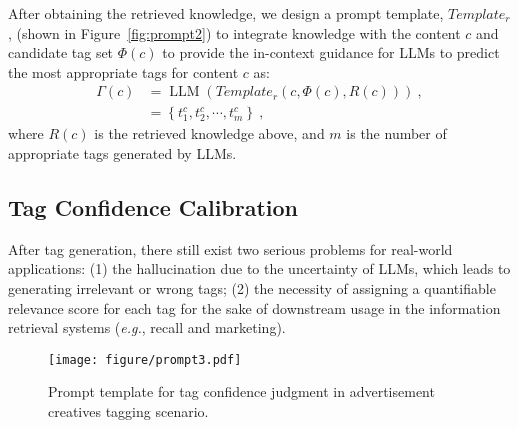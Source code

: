 After obtaining the retrieved knowledge, we design a prompt template, ${Template_r}$,  (shown in Figure~\ref{fig:prompt2}) to integrate knowledge with the content $c$ and candidate tag set $\Phi(c)$ to provide the in-context guidance for LLMs to predict the most appropriate tags for content $c$ as:
\begin{equation}
\begin{aligned}
      \Gamma(c)  &=\operatorname{LLM}({Template_r}(c, \Phi(c), R(c)))~, \\
      &= \left\{t^c_1, t^c_2, \cdots, t^c_m\right\}~,
\end{aligned}
\end{equation}
where $R(c)$ is the retrieved knowledge above, and $m$ is the number of appropriate tags generated by LLMs.





\subsection{Tag Confidence Calibration}
After tag generation, there still exist two serious problems for real-world applications: (1) the hallucination due to the uncertainty of LLMs, which leads to generating irrelevant or wrong tags; (2) the necessity of assigning a quantifiable relevance score for each tag for the sake of downstream usage in the information retrieval systems (\textit{e.g.}, recall and marketing). 


\begin{figure}[h]
    \centering
    \texttt{[image: figure/prompt3.pdf]}
    \caption{Prompt template for tag confidence judgment in advertisement creatives tagging scenario.}
    \label{fig:prompt3}
\end{figure}

